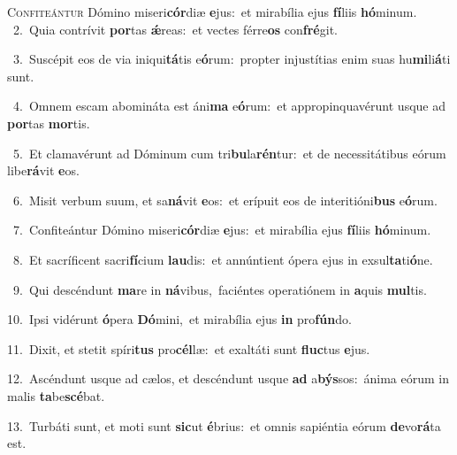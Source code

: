 \lettrine{\initial\textcolor{\initialcolor}{C}}{onfiteántur} Dómino miseri\-\textbf{cór}\-diæ \textbf{e}\-jus:~\star et mirabília ejus \textbf{fí}\-liis \textbf{hó}\-minum.\\
{\numbfont\textcolor{\numbcolor}{~2.}}~Quia contrívit \textbf{por}\-tas \textbf{ǽ}\-reas:~\star et vectes férre\textbf{os} con\-\textbf{fré}\-git.\par
{\numbfont\textcolor{\numbcolor}{~3.}}~Suscépit eos de via iniqui\-\textbf{tá}\-tis e\-\textbf{ó}\-rum:~\star propter injustítias enim suas hu\-\textbf{mi}\-li\-\textbf{á}\-ti sunt.\par
{\numbfont\textcolor{\numbcolor}{~4.}}~Omnem escam abomináta est áni\textbf{ma} e\-\textbf{ó}\-rum:~\star et appropinquavérunt usque ad \textbf{por}\-tas \textbf{mor}\-tis.\par
{\numbfont\textcolor{\numbcolor}{~5.}}~Et clamavérunt ad Dóminum cum tri\-\textbf{bu}\-la\-\textbf{rén}\-tur:~\star et de necessitátibus eórum libe\-\textbf{rá}\-vit \textbf{e}\-os.\par
{\numbfont\textcolor{\numbcolor}{~6.}}~Misit verbum suum, et sa\-\textbf{ná}\-vit \textbf{e}\-os:~\star et erípuit eos de interitióni\textbf{bus} e\-\textbf{ó}\-rum.\par
{\numbfont\textcolor{\numbcolor}{~7.}}~Confiteántur Dómino miseri\-\textbf{cór}\-diæ \textbf{e}\-jus:~\star et mirabília ejus \textbf{fí}\-liis \textbf{hó}\-minum.\par
{\numbfont\textcolor{\numbcolor}{~8.}}~Et sacríficent sacri\-\textbf{fí}\-cium \textbf{lau}\-dis:~\star et annúntient ópera ejus in exsul\-\textbf{ta}\-ti\-\textbf{ó}\-ne.\par
{\numbfont\textcolor{\numbcolor}{~9.}}~Qui descéndunt \textbf{ma}\-re in \textbf{ná}\-vibus,~\star faciéntes operatiónem in \textbf{a}\-quis \textbf{mul}\-tis.\par
{\numbfont\textcolor{\numbcolor}{10.}}~Ipsi vidérunt \textbf{ó}\-pera \textbf{Dó}\-mini,~\star et mirabília ejus \textbf{in} pro\-\textbf{fún}\-do.\par
{\numbfont\textcolor{\numbcolor}{11.}}~Dixit, et stetit spíri\textbf{tus} pro\-\textbf{cél}\-læ:~\star et exaltáti sunt \textbf{fluc}\-tus \textbf{e}\-jus.\par
{\numbfont\textcolor{\numbcolor}{12.}}~Ascéndunt usque ad cælos, et descéndunt usque \textbf{ad} a\-\textbf{býs}\-sos:~\star ánima eórum in malis \textbf{ta}\-be\-\textbf{scé}\-bat.\par
{\numbfont\textcolor{\numbcolor}{13.}}~Turbáti sunt, et moti sunt \textbf{sic}\-ut \textbf{é}\-brius:~\star et omnis sapiéntia eórum \textbf{de}\-vo\-\textbf{rá}\-ta est.\par
